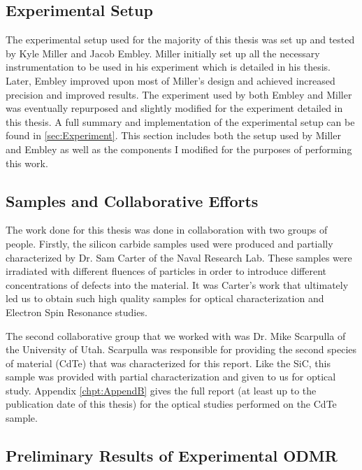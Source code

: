 \documentclass[oneside, astronomy, noacknowlegments]{BYUPhys}
\begin{document}
\subsection{Experimental Setup}

The experimental setup used for the majority of this thesis was set up and tested by Kyle Miller and Jacob Embley. Miller initially set up all the necessary instrumentation to be used in his experiment which is detailed in his thesis. Later, Embley improved upon most of Miller's design and achieved increased precision and improved results. The experiment used by both Embley and Miller was eventually repurposed and slightly modified for the experiment detailed in this thesis. A full summary and implementation of the experimental setup can be found in \ref{sec:Experiment}. This section includes both the setup used by Miller and Embley as well as the components I modified for the purposes of performing this work.

\subsection{Samples and Collaborative Efforts}

The work done for this thesis was done in collaboration with two groups of people. Firstly, the silicon carbide samples used were produced and partially characterized by Dr. Sam Carter of the Naval Research Lab. These samples were irradiated with different fluences of particles in order to introduce different concentrations of defects into the material. It was Carter's work that ultimately led us to obtain such high quality samples for optical characterization and Electron Spin Resonance studies.

The second collaborative group that we worked with was Dr. Mike Scarpulla of the University of Utah. Scarpulla was responsible for providing the second species of material (CdTe) that was characterized for this report. Like the SiC, this sample was provided with partial characterization and given to us for optical study. Appendix \ref{chpt:AppendB} gives the full report (at least up to the publication date of this thesis) for the optical studies performed on the CdTe sample.

\subsection{Preliminary Results of Experimental ODMR}
\end{document}
